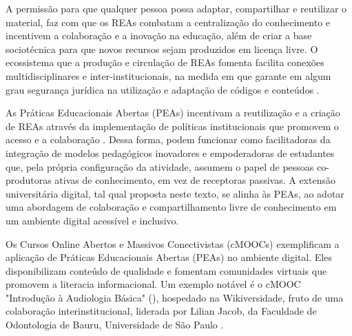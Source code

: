 \documentclass[portuguese]{textolivre}
\begin{document}
A permissão para que qualquer pessoa possa adaptar, compartilhar e
reutilizar o material, faz com que os REAs combatam a centralização do
conhecimento e incentivem a colaboração e a inovação na educação, além
de criar a base sociotécnica para que novos recursos sejam produzidos em
licença livre. O ecossistema que a produção e circulação de REAs fomenta
facilita conexões multidisciplinares e inter-institucionais, na medida
em que garante em algum grau segurança jurídica na utilização e
adaptação de códigos e conteúdos \cite{RamirezMontoya2020}.

As Práticas Educacionais Abertas (PEAs) incentivam a reutilização e a
criação de REAs através da implementação de políticas institucionais que
promovem o acesso e a colaboração \cite{Ehlers2011}. Dessa forma, podem
funcionar como facilitadoras da integração de modelos pedagógicos
inovadores e empoderadoras de estudantes que, pela própria configuração
da atividade, assumem o papel de pessoas co-produtoras ativas de
conhecimento, em vez de receptoras passivas. A extensão universitária
digital, tal qual proposta neste texto, se alinha às PEAs, ao adotar uma
abordagem de colaboração e compartilhamento livre de conhecimento em um
ambiente digital acessível e inclusivo.

Os Cursos Online Abertos e Massivos Conectivistas (cMOOCs) exemplificam
a aplicação de Práticas Educacionais Abertas (PEAs) no ambiente digital.
Eles disponibilizam conteúdo de qualidade e fomentam comunidades
virtuais que promovem a literacia informacional. Um exemplo notável é o
cMOOC "Introdução à Audiologia Básica" (), hospedado na
Wikiversidade, fruto de uma colaboração interinstitucional, liderada por
Lilian Jacob, da Faculdade de Odontologia de Bauru, Universidade de São
Paulo \cite{Arrigo2024}.
\end{document}
